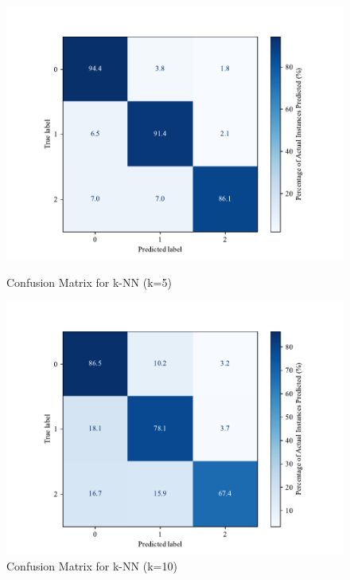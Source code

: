 \begin{figure}[htbp]
    \centering
    \begin{minipage}[b]{0.45\textwidth}
        \centering
        \includegraphics[width=\textwidth]{images/confusion_matrix_knn5.pdf}
        \caption{Confusion Matrix for k-NN (k=5)}
        \label{fig:confusion_knn_5}
    \end{minipage}
    \hfill
    \begin{minipage}[b]{0.45\textwidth}
        \centering
        \includegraphics[width=\textwidth]{images/confusion_matrix_knn10.pdf}
        \caption{Confusion Matrix for k-NN (k=10)}
        \label{fig:confusion_knn_10}
    \end{minipage}
\end{figure}

